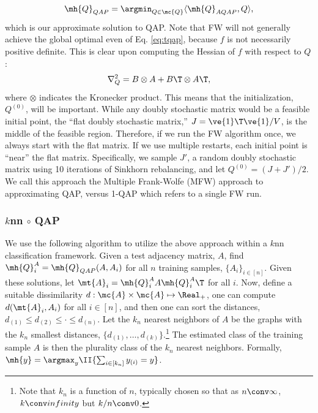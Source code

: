 \begin{align}
	\mh{Q}_{QAP} = \argmin_{Q \in \mc{Q}} \langle \mh{Q}_{AQAP}, Q \rangle,
\end{align}
which is our approximate solution to QAP.  Note that FW will not generally achieve the global optimal even of Eq. \eqref{eq:tqap}, because $f$ is not necessarily positive definite.  This is clear upon computing the Hessian of $f$  with respect to $Q$:
\begin{align}
	\nabla_Q^2  =  B \otimes A + B\T \otimes A\T,
\end{align}
where $\otimes$ indicates the Kronecker product. This means that the initialization, $Q^{(0)}$, will be important.  While any doubly stochastic matrix would be a feasible initial point,  the ``flat doubly  stochastic matrix,'' $J=\ve{1}\T \ve{1}/V$, is the middle of the feasible region.  Therefore, if we run the FW algorithm once, we always start with the flat matrix.  If we use multiple restarts, each initial point is ``near'' the flat matrix.  Specifically, we sample $J'$, a random doubly stochastic matrix using 10 iterations of Sinkhorn rebalancing, and let $Q^{(0)}=(J+J')/2$.  We call this approach the Multiple Frank-Wolfe (MFW) approach to approximating QAP, versus 1-QAP which refers to a single FW run.


\subsubsection{$k$nn $\circ$ QAP} %
\label{ssub:_k_nn_circ_qap}


We use the following algorithm to utilize the above approach within a $k$nn classification framework.  Given a test adjacency matrix, $A$, find $\mh{Q}_i^A=\mh{Q}_{QAP}(A,A_i)$ for all $n$ training samples, $\{A_i\}_{i \in [n]}$.  Given these solutions, let $\mt{A}_i=\mh{Q}_i^A A {\mh{Q}_i^A}{}\T$ for all $i$. Now, define a suitable dissimilarity $d: \mc{A} \times \mc{A} \mapsto \Real_+$, one can compute $d(\mt{A}_i,A_i)$ for all $i \in [n]$, and then one can sort the distances, $d_{(1)} \leq d_{(2)} \leq \cdot \leq d_{(n)}$.  Let the $k_n$ nearest neighbors of $A$ be the graphs with the $k_n$ smallest distances, $\{d_{(1)},\ldots, d_{(k)}\}$.\footnote{Note that $k_n$ is a function of $n$, typically chosen so that as $n \conv \infty$, $k \conv infinity$ but $k/n \conv 0$.}  The estimated class of the training sample $A$ is then the plurality class of the $k_n$ nearest neighbors.  Formally, $\mh{y}=\argmax_{y} \II\{\sum_{i \in [k_n]} y_{(i)} = y \}$.

